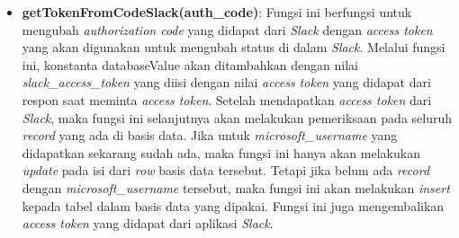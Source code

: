 \begin{itemize}
\begin{itemize}
        \item \textbf{getTokenFromCodeSlack(auth\_code)}: Fungsi ini berfungsi untuk mengubah \textit{authorization code} yang didapat dari \textit{Slack} dengan \textit{access token} yang akan digunakan untuk mengubah status di dalam \textit{Slack}. Melalui fungsi ini, konstanta databaseValue akan ditambahkan dengan nilai \textit{slack\_access\_token} yang diisi dengan nilai \textit{access token} yang didapat dari respon saat meminta \textit{access token}. Setelah mendapatkan \textit{access token} dari \textit{Slack}, maka fungsi ini selanjutnya akan melakukan pemeriksaan pada seluruh \textit{record} yang ada di basis data. Jika untuk \textit{microsoft\_username} yang didapatkan sekarang sudah ada, maka fungsi ini hanya akan melakukan \textit{update} pada isi dari \textit{row} basis data tersebut. Tetapi jika belum ada \textit{record} dengan \textit{microsoft\_username} tersebut, maka fungsi ini akan melakukan \textit{insert} kepada tabel dalam basis data yang dipakai. Fungsi ini juga mengembalikan \textit{access token} yang didapat dari aplikasi \textit{Slack}. 
    \end{itemize}
\end{itemize}

